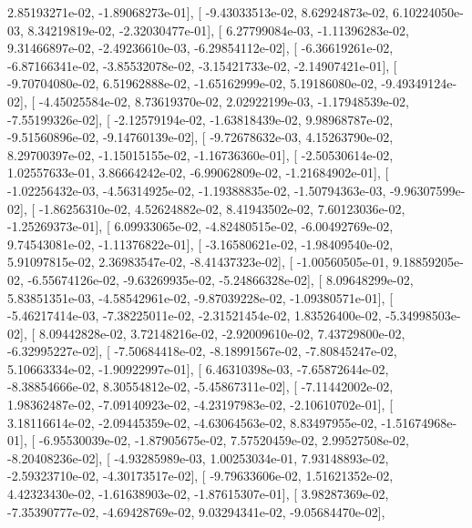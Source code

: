 \documentclass{article}
\begin{document}
          2.85193271e-02,  -1.89068273e-01],
       [ -9.43033513e-02,   8.62924873e-02,   6.10224050e-03,
          8.34219819e-02,  -2.32030477e-01],
       [  6.27799084e-03,  -1.11396283e-02,   9.31466897e-02,
         -2.49236610e-03,  -6.29854112e-02],
       [ -6.36619261e-02,  -6.87166341e-02,  -3.85532078e-02,
         -3.15421733e-02,  -2.14907421e-01],
       [ -9.70704080e-02,   6.51962888e-02,  -1.65162999e-02,
          5.19186080e-02,  -9.49349124e-02],
       [ -4.45025584e-02,   8.73619370e-02,   2.02922199e-03,
         -1.17948539e-02,  -7.55199326e-02],
       [ -2.12579194e-02,  -1.63818439e-02,   9.98968787e-02,
         -9.51560896e-02,  -9.14760139e-02],
       [ -9.72678632e-03,   4.15263790e-02,   8.29700397e-02,
         -1.15015155e-02,  -1.16736360e-01],
       [ -2.50530614e-02,   1.02557633e-01,   3.86664242e-02,
         -6.99062809e-02,  -1.21684902e-01],
       [ -1.02256432e-03,  -4.56314925e-02,  -1.19388835e-02,
         -1.50794363e-03,  -9.96307599e-02],
       [ -1.86256310e-02,   4.52624882e-02,   8.41943502e-02,
          7.60123036e-02,  -1.25269373e-01],
       [  6.09933065e-02,  -4.82480515e-02,  -6.00492769e-02,
          9.74543081e-02,  -1.11376822e-01],
       [ -3.16580621e-02,  -1.98409540e-02,   5.91097815e-02,
          2.36983547e-02,  -8.41437323e-02],
       [ -1.00560505e-01,   9.18859205e-02,  -6.55674126e-02,
         -9.63269935e-02,  -5.24866328e-02],
       [  8.09648299e-02,   5.83851351e-03,  -4.58542961e-02,
         -9.87039228e-02,  -1.09380571e-01],
       [ -5.46217414e-03,  -7.38225011e-02,  -2.31521454e-02,
          1.83526400e-02,  -5.34998503e-02],
       [  8.09442828e-02,   3.72148216e-02,  -2.92009610e-02,
          7.43729800e-02,  -6.32995227e-02],
       [ -7.50684418e-02,  -8.18991567e-02,  -7.80845247e-02,
          5.10663334e-02,  -1.90922997e-01],
       [  6.46310398e-03,  -7.65872644e-02,  -8.38854666e-02,
          8.30554812e-02,  -5.45867311e-02],
       [ -7.11442002e-02,   1.98362487e-02,  -7.09140923e-02,
         -4.23197983e-02,  -2.10610702e-01],
       [  3.18116614e-02,  -2.09445359e-02,  -4.63064563e-02,
          8.83497955e-02,  -1.51674968e-01],
       [ -6.95530039e-02,  -1.87905675e-02,   7.57520459e-02,
          2.99527508e-02,  -8.20408236e-02],
       [ -4.93285989e-03,   1.00253034e-01,   7.93148893e-02,
         -2.59323710e-02,  -4.30173517e-02],
       [ -9.79633606e-02,   1.51621352e-02,   4.42323430e-02,
         -1.61638903e-02,  -1.87615307e-01],
       [  3.98287369e-02,  -7.35390777e-02,  -4.69428769e-02,
          9.03294341e-02,  -9.05684470e-02],
\end{document}

